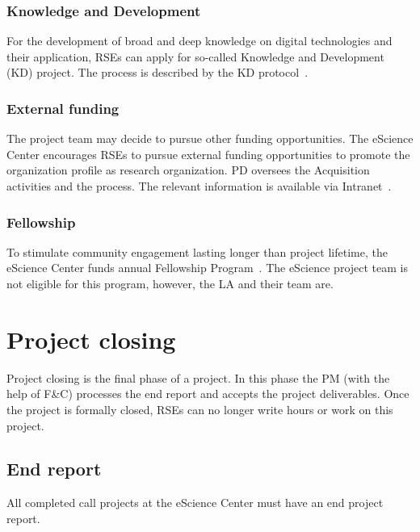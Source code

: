 \documentclass[11pt]{article}
\begin{document}
\subsubsection{Knowledge and Development}
\label{sec:opportunities:kd}
For the development of broad and deep knowledge on digital technologies and their application, RSEs can apply for
so-called Knowledge and Development (KD) project. The process is described by the KD protocol~\cite{kd-intranet}.

\subsubsection{External funding}
\label{sec:opportunities:external-funding}
The project team may decide to pursue other funding opportunities. The eScience Center encourages RSEs to pursue
external funding opportunities to promote the organization profile as research organization. PD oversees the
Acquisition activities and the process. The relevant information is available via Intranet~\cite{acqisition-intranet}.


\subsubsection{Fellowship}
\label{sec:opportunities:fellowship}
To stimulate community engagement lasting longer than project lifetime, the eScience Center funds annual Fellowship
Program~\cite{fellowship-intranet}. The eScience project team is not eligible for this program, however, the LA and their team are.


\clearpage
\section{Project closing}
\label{sec:closing}

Project closing is the final phase of a project. In this phase the PM (with the help of F\&C) processes the end report
and accepts the project deliverables. Once the project is formally closed, RSEs can no longer write hours or work on
this project. 


\bigskip

\subsection{End report}
\label{sec:closing:end}
All completed call projects at the eScience Center must have an end project report.
\end{document}
